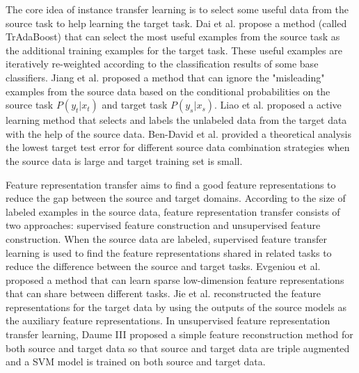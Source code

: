 The core idea of instance transfer learning is to select some useful data from the source task to help learning the target task. Dai et al. \cite{dai2007boosting} propose a method (called TrAdaBoost) that can select the most useful examples from the source task as the additional training examples for the target task. These useful examples are iteratively re-weighted according to the classification results of some base classifiers. Jiang et al. \cite{jiang2007instance} proposed a method that can ignore the "misleading" examples from the source data based on the conditional probabilities on the source task $P(y_t|x_t)$ and target task $P(y_s|x_s)$. Liao et al. \cite{liao2005logistic} proposed a active learning method that selects and labels the unlabeled data from the target data with the help of the source data. Ben-David et al. \cite{ben2010theory} provided a theoretical analysis the lowest target test error for different source data combination strategies when the source data is large and target training set is small.   

Feature representation transfer aims to find a good feature representations to reduce the gap between the source and target domains. According to the size of labeled examples in the source data, feature representation transfer consists of two approaches: supervised feature construction and unsupervised feature construction. When the source data are labeled, supervised feature transfer learning is used to find the feature representations shared in related tasks to reduce the difference between the source and target tasks. Evgeniou et al. \cite{evgeniou2007multi} proposed a method that can learn sparse low-dimension feature representations that can share between different tasks. Jie et al. \cite{jie2011multiclass} reconstructed the feature representations for the target data by using the outputs of the source models as the auxiliary feature representations. In unsupervised feature representation transfer learning, Daume III \cite{daume2009frustratingly} proposed a simple feature reconstruction method for both source and target data so that source and target data are triple augmented and a SVM model is trained on both source and target data.

